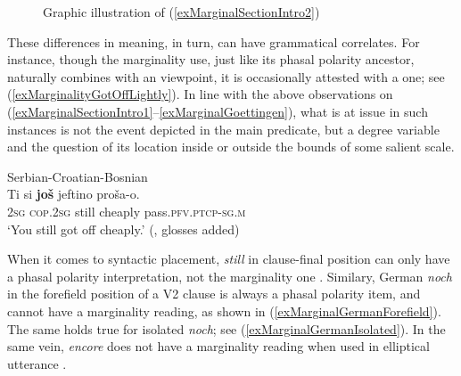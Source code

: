 \begin{figure}[hbt]
	\setlength{\fboxsep}{0pt}
	\setlength{\fboxrule}{0.5pt}
	\caption{Graphic illustration of (\ref{exMarginalSectionIntro2})\label{figureMarginalityMap}}
\end{figure}

These differences in meaning, in turn, can have grammatical correlates. For instance, though the marginality use, just like its phasal polarity ancestor, naturally combines with an  viewpoint, it is occasionally attested with a  one; see (\ref{exMarginalityGotOffLightly}). In line with the above observations on (\ref{exMarginalSectionIntro1}–\ref{exMarginalGoettingen}), what is at issue in such instances is not the event depicted in the main predicate, but a degree variable and the question of its location inside or outside the bounds of some salient scale. 

\begin{exe}
	\ex Serbian-Croatian-Bosnian \label{exMarginalityGotOffLightly}\\
	\gll Ti si \textbf{još} jeftino proša-o.\\
	2\textsc{sg} \textsc{cop}.2\textsc{sg} still cheaply pass.\textsc{pfv}.\textsc{ptcp}-\textsc{sg}.\textsc{m}\\
	\glt \lq You still got off cheaply.\rq{ }(\cite[72]{Prajnkovic2018}, glosses added)
\end{exe}

When it comes to syntactic placement,  \textit{still} in clause-final position can only have a phasal polarity interpretation, not the marginality one \parencite{Michaelis1993}. Similary, German \textit{noch} in the forefield position of a V2 clause is always a phasal polarity item, and cannot have a marginality reading, as shown in (\ref{exMarginalGermanForefield}). The same holds true for isolated \textit{noch}; see (\ref{exMarginalGermanIsolated}). In the same vein,  \textit{encore} does not have a marginality reading when used in elliptical utterance \parencite[173]{MosegaardHansen2008}.

